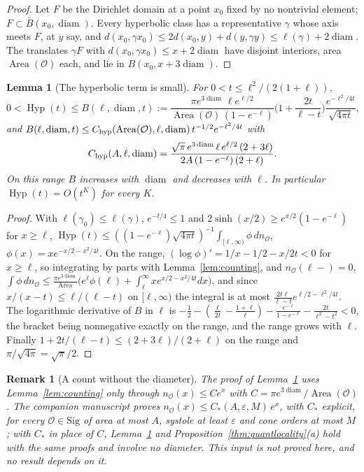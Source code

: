 \documentclass[pdflatex,sn-mathphys-num]{sn-jnl}
\theoremstyle{thmstyleone}%
\newtheorem{lemma}[theorem]{Lemma}%
\theoremstyle{thmstylethree}%
\newtheorem{remark}[theorem]{Remark}%
\newcommand{\Orb}{\mathcal{O}}
\newcommand{\Sig}{\mathrm{Sig}}
\newcommand{\Area}{\operatorname{Area}}
\newcommand{\Hyp}{\operatorname{Hyp}}
\newcommand{\diam}{\operatorname{diam}}
\begin{document}
\begin{proof}
Let $F$ be the Dirichlet domain at a point $x_0$ fixed by no nontrivial element; $F\subset\bar B(x_0,\diam)$. Every hyperbolic class has a representative $\gamma$ whose axis meets $F$, at $y$ say, and $d(x_0,\gamma x_0)\le2d(x_0,y)+d(y,\gamma y)\le\ell(\gamma)+2\diam$. The translates $\gamma F$ with $d(x_0,\gamma x_0)\le x+2\diam$ have disjoint interiors, area $\Area(\Orb)$ each, and lie in $B(x_0,x+3\diam)$.
\end{proof}

\begin{lemma}[The hyperbolic term is small]\label{lem:hypbound}
For $0<t\le\ell^2/(2(1+\ell))$,
\[
  0<\Hyp(t)\le B(\ell,\diam,t):=\frac{\pi e^{3\diam}\,\ell e^{\ell/2}}{\Area(\Orb)\,(1-e^{-\ell})}\Big(1+\frac{2t}{\ell-t}\Big)\frac{e^{-\ell^2/4t}}{\sqrt{4\pi t}},
\]
and $B(\ell,\diam,t)\le C_{\rm hyp}(\Area(\Orb),\ell,\diam)\,t^{-1/2}e^{-\ell^2/4t}$ with
\begin{equation}\label{eq:Cconst}
  C_{\rm hyp}(A,\ell,\diam)=\frac{\sqrt\pi\,e^{3\diam}\,\ell\,e^{\ell/2}\,(2+3\ell)}{2A\,(1-e^{-\ell})\,(2+\ell)} .
\end{equation}
On this range $B$ increases with $\diam$ and decreases with $\ell$. In particular $\Hyp(t)=O(t^K)$ for every $K$.
\end{lemma}

\begin{proof}
With $\ell(\gamma_0)\le\ell(\gamma)$, $e^{-t/4}\le1$ and $2\sinh(x/2)\ge e^{x/2}(1-e^{-\ell})$ for $x\ge\ell$, $\Hyp(t)\le((1-e^{-\ell})\sqrt{4\pi t})^{-1}\int_{[\ell,\infty)}\phi\,dn_\Orb$, $\phi(x)=xe^{-x/2-x^2/4t}$. On the range, $(\log\phi)'=1/x-1/2-x/2t<0$ for $x\ge\ell$, so integrating by parts with Lemma~\ref{lem:counting}, and $n_\Orb(\ell-)=0$, $\int\phi\,dn_\Orb\le\frac{\pi e^{3\diam}}{\Area}\big(e^\ell\phi(\ell)+\int_\ell^\infty xe^{x/2-x^2/4t}dx\big)$, and since $x/(x-t)\le\ell/(\ell-t)$ on $[\ell,\infty)$ the integral is at most $\frac{2t\ell}{\ell-t}e^{\ell/2-\ell^2/4t}$. The logarithmic derivative of $B$ in $\ell$ is $-\frac12-(\frac\ell{2t}-\frac{1+\ell}\ell)-\frac{e^{-\ell}}{1-e^{-\ell}}-\frac{2t}{\ell^2-t^2}<0$, the bracket being nonnegative exactly on the range, and the range grows with $\ell$. Finally $1+2t/(\ell-t)\le(2+3\ell)/(2+\ell)$ on the range and $\pi/\sqrt{4\pi}=\sqrt\pi/2$.
\end{proof}

\begin{remark}[A count without the diameter]\label{rem:nodiam}
The proof of Lemma~\ref{lem:hypbound} uses Lemma~\ref{lem:counting} only through $n_\Orb(x)\le Ce^x$ with $C=\pi e^{3\diam}/\Area(\Orb)$. The companion manuscript proves $n_\Orb(x)\le C_*(A,\varepsilon,M)\,e^x$, with $C_*$ explicit, for every $\Orb\in\Sig$ of area at most $A$, systole at least $\varepsilon$ and cone orders at most $M$ \cite[Lemma~4.5]{companionB}; with $C_*$ in place of $C$, Lemma~\ref{lem:hypbound} and Proposition~\ref{thm:quantlocality}(a) hold with the same proofs and involve no diameter. This input is not proved here, and no result depends on it.
\end{remark}
\end{document}

